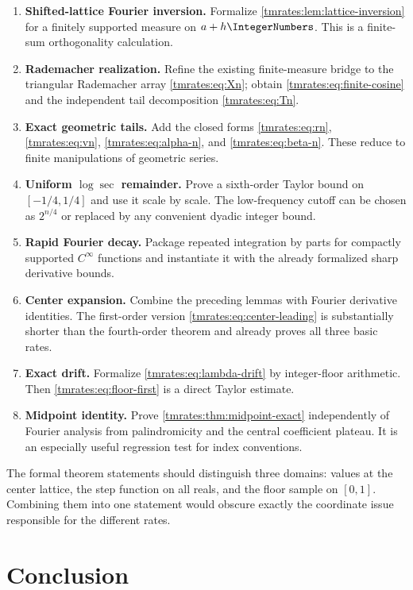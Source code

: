 \documentclass[11pt,oneside]{article}
\theoremstyle{definition}
\theoremstyle{remark}
\begin{document}
\begin{enumerate}
\item \textbf{Shifted-lattice Fourier inversion.}  Formalize \cref{tmrates:lem:lattice-inversion} for
a finitely supported measure on $a+h\IntegerNumbers$.  This is a finite-sum orthogonality calculation.
\item \textbf{Rademacher realization.}  Refine the existing finite-measure bridge to the
triangular Rademacher array \eqref{tmrates:eq:Xn}; obtain \eqref{tmrates:eq:finite-cosine} and the independent
tail decomposition \eqref{tmrates:eq:Tn}.
\item \textbf{Exact geometric tails.}  Add the closed forms \eqref{tmrates:eq:rn}, \eqref{tmrates:eq:vn},
\eqref{tmrates:eq:alpha-n}, and \eqref{tmrates:eq:beta-n}.  These reduce to finite manipulations of geometric
series.
\item \textbf{Uniform $\log\sec$ remainder.}  Prove a sixth-order Taylor bound on
$[-1/4,1/4]$ and use it scale by scale.  The low-frequency cutoff can be chosen as
$2^{n/4}$ or replaced by any convenient dyadic integer bound.
\item \textbf{Rapid Fourier decay.}  Package repeated integration by parts for compactly
supported $C^\infty$ functions and instantiate it with the already formalized sharp derivative
bounds.
\item \textbf{Center expansion.}  Combine the preceding lemmas with Fourier derivative
identities.  The first-order version \eqref{tmrates:eq:center-leading} is substantially shorter than
the fourth-order theorem and already proves all three basic rates.
\item \textbf{Exact drift.}  Formalize \eqref{tmrates:eq:lambda-drift} by integer-floor arithmetic.
Then \eqref{tmrates:eq:floor-first} is a direct Taylor estimate.
\item \textbf{Midpoint identity.}  Prove \cref{tmrates:thm:midpoint-exact} independently of Fourier
analysis from palindromicity and the central coefficient plateau.  It is an especially useful
regression test for index conventions.
\end{enumerate}

The formal theorem statements should distinguish three domains: values at the center lattice,
the step function on all reals, and the floor sample on $[0,1]$.  Combining them into one
statement would obscure exactly the coordinate issue responsible for the different rates.

\section{Conclusion}
\label{tmrates:sec:conclusion}
\end{document}
